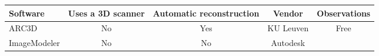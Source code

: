 \documentclass[scriptsize,a4paper,twoside,openright]{report}
\begin{document}
\begin{center}
\begin{table}
\begin{tabularx}{\textwidth}{@{} Y c c c c @{}} %
\toprule
\textbf{Software} & \textbf{Uses a 3D scanner} & \textbf{Automatic reconstruction} & \textbf{Vendor} & \textbf{Observations}\\ \hline
\midrule
ARC3D &   No       &     Yes      &   KU Leuven & Free\\ \hline \addlinespace
ImageModeler&   No       &     No      &   Autodesk & \\  
\bottomrule
\end{tabularx}
\label{table:nonlin}
\end{table}
\end{center}
\end{document}
